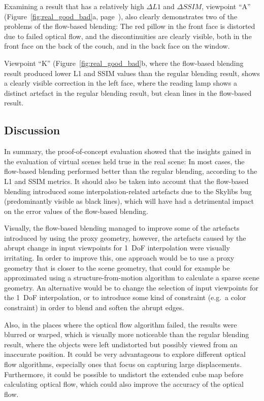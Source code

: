 Examining a result that has a relatively high $\Delta L1$ and $\Delta SSIM$, viewpoint ``A'' (Figure~\ref{fig:real_good_bad}a, page~\pageref{fig:real_good_bad}), also clearly demonstrates two of the problems of the flow-based blending: The red pillow in the front face is distorted due to failed optical flow, and the discontinuities are clearly visible, both in the front face on the back of the couch, and in the back face on the window.

Viewpoint ``K'' (Figure~\ref{fig:real_good_bad}b, where the flow-based blending result produced lower L1 and SSIM values than the regular blending result, shows a clearly visible correction in the left face, where the reading lamp shows a distinct artefact in the regular blending result, but clean lines in the flow-based result. 


\subsection{Discussion}
In summary, the proof-of-concept evaluation showed that the insights gained in the evaluation of virtual scenes held true in the real scene: In most cases, the flow-based blending performed better than the regular blending, according to the L1 and SSIM metrics. It should also be taken into account that the flow-based blending introduced some interpolation-related artefacts due to the Skylibs bug (predominantly visible as black lines), which will have had a detrimental impact on the error values of the flow-based blending.

Visually, the flow-based blending managed to improve some of the artefacts introduced by using the proxy geometry, however, the artefacts caused by the abrupt change in input viewpoints for 1~DoF interpolation were visually irritating.
In order to improve this, one approach would be to use a proxy geometry that is closer to the scene geometry, that could for example be approximated using a structure-from-motion algorithm to calculate a sparse scene geometry. An alternative would be to change the selection of input viewpoints for the 1~DoF interpolation, or to introduce some kind of constraint (e.g.\ a color constraint) in order to blend and soften the abrupt edges.

Also, in the places where the optical flow algorithm failed, the results were blurred or warped, which is visually more noticeable than the regular blending result, where the objects were left undistorted but possibly viewed from an inaccurate position. It could be very advantageous to explore different optical flow algorithms, especially ones that focus on capturing large displacements. Furthermore, it could be possible to undistort the extended cube map before calculating optical flow, which could also improve the accuracy of the optical flow.


